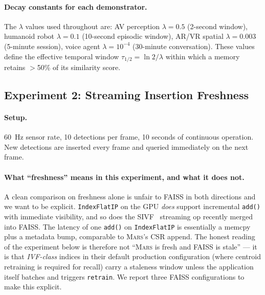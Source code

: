 \documentclass[11pt]{article}
\newcommand{\mars}{\textsc{Mars}}
\begin{document}
\paragraph{Decay constants for each demonstrator.} The $\lambda$ values
used throughout are: AV perception $\lambda = 0.5$ (2-second window),
humanoid robot $\lambda = 0.1$ (10-second episodic window), AR/VR
spatial $\lambda = 0.003$ (5-minute session), voice agent
$\lambda = 10^{-4}$ (30-minute conversation). These values define the
effective temporal window $\tau_{1/2} = \ln 2 / \lambda$ within which a
memory retains $>$50\% of its similarity score.

\subsection{Experiment 2: Streaming Insertion Freshness}
\label{sec:streaming}

\paragraph{Setup.} 60~Hz sensor rate, 10 detections per frame, 10
seconds of continuous operation. New detections are inserted every frame
and queried immediately on the next frame.

\paragraph{What ``freshness'' means in this experiment, and what it
does not.} A clean comparison on freshness alone is unfair to FAISS in
both directions and we want to be explicit. \texttt{IndexFlatIP} on
the GPU \emph{does} support incremental \texttt{add()} with immediate
visibility, and so does the SIVF~\cite{sivf} streaming op recently
merged into FAISS. The latency of one
\texttt{add()} on \texttt{IndexFlatIP} is essentially a memcpy plus a
metadata bump, comparable to \mars{}'s CSR append. The honest reading
of the experiment below is therefore not ``\mars{} is fresh and FAISS
is stale'' --- it is that \emph{IVF-class} indices in their default
production configuration (where centroid retraining is required for
recall) carry a staleness window unless the application itself
batches and triggers \texttt{retrain}. We report three FAISS
configurations to make this explicit.
\end{document}
